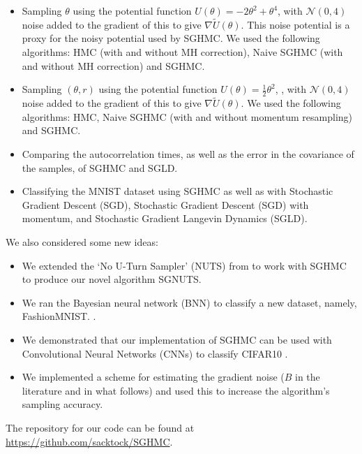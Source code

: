 \begin{itemize}
    \item Sampling $\theta$ using the potential function $U(\theta) = -2\theta^2 + \theta^4$, with $\mathcal{N}(0,4)$ noise added to the gradient of this to give $\nabla \widetilde U (\theta)$. This noise potential is a proxy for the noisy potential used by SGHMC. We used the following algorithms: HMC (with and without MH correction), Naive SGHMC (with and without MH correction) and SGHMC.

    \item  Sampling $(\theta,r)$ using the potential function $U(\theta) = \frac{1}{2}\theta^2$, , with $\mathcal{N}(0,4)$ noise added to the gradient of this to give $\nabla \widetilde U (\theta)$. We used the following algorithms: HMC, Naive SGHMC (with and without momentum resampling) and SGHMC.
  \item Comparing the autocorrelation times, as well as the error in the covariance of the samples, of SGHMC and SGLD.
    \item Classifying the MNIST dataset \cite{mnist} using SGHMC as well as with Stochastic Gradient Descent (SGD), Stochastic Gradient Descent (SGD) with momentum, and Stochastic Gradient Langevin Dynamics (SGLD).
\end{itemize}

We also considered some new ideas:

\begin{itemize}
    \item We extended the `No U-Turn Sampler' (NUTS) from \cite{nuts} to work with SGHMC to produce our novel algorithm SGNUTS.
    \item We ran the Bayesian neural network (BNN) to classify a new dataset, namely, FashionMNIST. \cite{fashion-mnist}.
    \item We demonstrated that our implementation of SGHMC can be used with Convolutional Neural Networks (CNNs) to classify CIFAR10 \cite{cifar10}.
    \item We implemented a scheme for estimating the gradient noise ($B$ in the literature and in what follows) and used this to increase the algorithm’s sampling accuracy.
\end{itemize}

The repository for our code can be found at \url{https://github.com/sacktock/SGHMC}.
